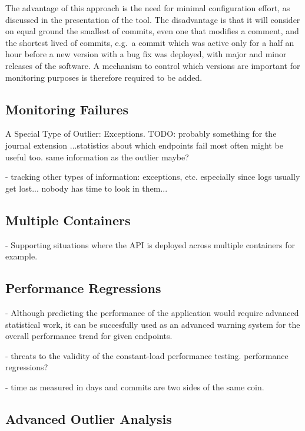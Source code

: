       The advantage of this approach is the need for minimal configuration effort, as discussed in the presentation of the tool. The disadvantage is that it will consider on equal ground the smallest of commits, even one that modifies a comment, and the shortest lived of commits, e.g.~a commit which was active only for a half an hour before a new version with a bug fix was deployed, with major and minor releases of the software. %
    A mechanism to control which versions are important for monitoring purposes is therefore required to be added.


  \subsection*{Monitoring Failures} 

    A Special Type of Outlier: Exceptions. TODO: probably something for the journal extension ...statistics about which endpoints fail most often might be useful too.
    same information as the outlier maybe?

    - tracking other types of information: exceptions, etc. especially since logs usually get lost... nobody has time to look in them...


  \subsection*{Multiple Containers}

  -   Supporting situations where the API is deployed across multiple containers for example.


  \subsection*{Performance Regressions}

    - Although predicting the performance of the application would require advanced statistical work, it can be succesfully used as an advanced warning system for the overall performance trend for given endpoints.

    - threats to the validity of the constant-load performance testing. performance regressions? 


    - time as measured in days and commits are two sides of the same coin. 


  \subsection*{Advanced Outlier Analysis}

